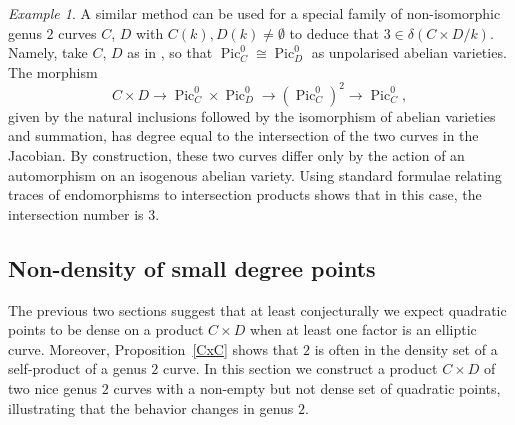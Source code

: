 \documentclass[a4paper,11pt]{amsart}
\theoremstyle{plain}
\theoremstyle{remark}
\newtheorem{example}[thm]{Example}
\newcommand{\Pic}{\operatorname{Pic}}
\newcommand{\dendegs}{\delta}
\begin{document}
\begin{example}\label{ex:isomorphicJacobians}
A similar method can be used for a special family of non-isomorphic genus $2$ curves $C$, $D$ with $C(k), D(k)\neq\emptyset$ to deduce that $3 \in \dendegs(C \times D / k)$. Namely, take $C$, $D$ as in \cite[Theorem 2]{howe05}, so that $\Pic^0_C \cong \Pic^0_D$ as unpolarised abelian varieties. The morphism \[C \times D \to \Pic^0_C \times \Pic^0_D \to (\Pic^0_C)^2 \to \Pic^0_C,\] given by the natural inclusions followed by the isomorphism of abelian varieties and summation, has degree equal to the intersection of the two curves in the Jacobian. By construction, these two curves differ only by the action of an automorphism on an isogenous abelian variety. Using standard formulae relating traces of endomorphisms to intersection products shows that in this case, the intersection number is 3. \end{example}

\subsection{Non-density of small degree points}\label{sec:nondensity} 
The previous two sections suggest that at least conjecturally we expect quadratic points to be dense on a product $C\times D$ when at least one factor is an elliptic curve. Moreover, Proposition~\ref{CxC} shows that $2$ is often in the density set of a self-product of a genus $2$ curve. In this section we construct a product $C\times D$ of two nice genus $2$ curves with a non-empty but not dense set of quadratic points, illustrating that the behavior changes in genus $2$. 
\end{document}
